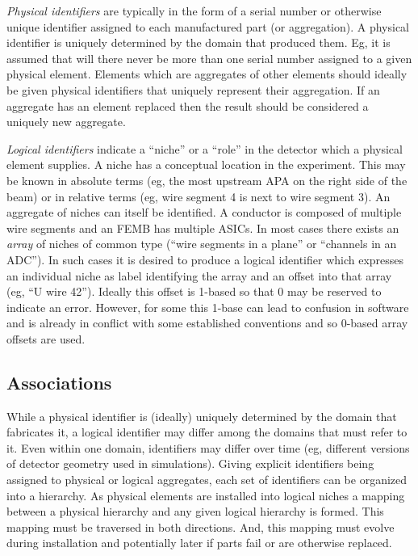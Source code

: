 \documentclass[letterpaper,twoside,onecolumn,report]{memoir}
\begin{document}
\textit{Physical identifiers} are typically in the form of a serial
number or otherwise unique identifier assigned to each manufactured
part (or aggregation).  A physical identifier is uniquely determined
by the domain that produced them.  Eg, it is assumed that will there
never be more than one serial number assigned to a given physical
element.  Elements which are aggregates of other elements should
ideally be given physical identifiers that uniquely represent their
aggregation.  If an aggregate has an element replaced then the result
should be considered a uniquely new aggregate.  

\textit{Logical identifiers} indicate a ``niche'' or a ``role'' in the
detector which a physical element supplies.  A niche has a conceptual
location in the experiment.  This may be known in absolute terms (eg,
the most upstream APA on the right side of the beam) or in relative
terms (eg, wire segment 4 is next to wire segment 3).  An aggregate of
niches can itself be identified.  A conductor is composed of multiple
wire segments and an FEMB has multiple ASICs.  In most cases there
exists an \textit{array} of niches of common type (``wire segments in
a plane'' or ``channels in an ADC'').  In such cases it is desired to
produce a logical identifier which expresses an individual niche as
label identifying the array and an offset into that array (eg, ``U
wire 42'').  Ideally this offset is 1-based so that 0 may be reserved
to indicate an error.  However, for some this 1-base can lead to
confusion in software and is already in conflict with some established
conventions and so 0-based array offsets are used.

\subsection{Associations}

While a physical identifier is (ideally) uniquely determined by the
domain that fabricates it, a logical identifier may differ among the
domains that must refer to it.  Even within one domain, identifiers
may differ over time (eg, different versions of detector geometry used
in simulations).  Giving explicit identifiers being assigned to
physical or logical aggregates, each set of identifiers can be
organized into a hierarchy.  As physical elements are installed into
logical niches a mapping between a physical hierarchy and any given
logical hierarchy is formed.  This mapping must be traversed in both
directions.  And, this mapping must evolve during installation and
potentially later if parts fail or are otherwise replaced.
\end{document}
